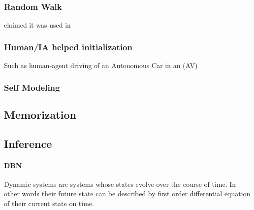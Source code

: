 \documentclass{article}
\begin{document}
				\subsubsection{Random Walk} \cite{regazzoni-2020-multi-sensorial-generative-and-descriptive-self-awareness-models-for-autonomous-systems} claimed it was used in \citep{kanapram-2019-dynamic-bayesian-approach-for-decision-making-in-ego-things}
				\subsubsection{Human/IA helped initialization} Such as human-agent driving of an Autonomous Car in an (AV)
				\subsubsection{Self Modeling}
				\citet{kwiatkowski-2019-task-agnostic-self-modeling-machines} \citet{kwiatkowski-2019-zero-shot-learning-on-simulated-robots}
			\subsection{Memorization}
			\subsection{Inference}
				\paragraph{DBN} 
				Dynamic systems are systems whose states evolve over the course of time. In other words their future state can be described by first order differential equation of their current state on time. 
\end{document}

